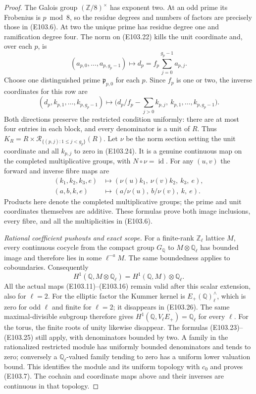 \begin{proof}
The Galois group $(\mathbb Z/8)^\times$ has exponent two.
At an odd prime its Frobenius is $p\bmod8$, so the residue
degrees and numbers of factors are precisely those in
(E103.6).  At two the unique prime has residue degree one
and ramification degree four.  The norm on (E103.22) kills
the unit coordinate and, over each $p$, is
\[
 (a_{p,0},\ldots,a_{p,g_p-1})\longmapsto
 d_p=f_p\sum_{j=0}^{g_p-1}a_{p,j}.
 \tag{E103.23}
\]
Choose one distinguished prime $\mathfrak p_{p,0}$ for each $p$.
Since $f_p$ is one or two, the inverse coordinates for this row are
\[
 (d_p,k_{p,1},\ldots,k_{p,g_p-1})\longmapsto
 \bigl(d_p/f_p-\sum_{j>0}k_{p,j},\ k_{p,1},\ldots,k_{p,g_p-1}\bigr).
 \tag{E103.24}
\]
Both directions preserve the restricted condition uniformly:
there are at most four entries in each block, and every
denominator is a unit of $R$.  Thus
$K_R=R\times\mathcal R_{\{(p,j):1\le j<g_p\}}(R)$.
Let $\nu$ be the norm section setting the unit coordinate and
all $k_{p,j}$ to zero in (E103.24).  It is a genuine continuous
map on the completed multiplicative groups, with $N\circ\nu=\operatorname{id}$.
For any $(u,v)$ the forward and inverse fibre maps are
\[
 \begin{split}
 (k_1,k_2,k_3,e)&\longmapsto
       (\nu(u)k_1,\ \nu(v)k_2,\ k_3,\ e),\\
 (a,b,k,e)&\longmapsto
       (a/\nu(u),\ b/\nu(v),\ k,\ e).
 \end{split}
 \tag{E103.25}
\]
Products here denote the completed multiplicative groups;
the prime and unit coordinates themselves are additive.
These formulas prove both image inclusions, every fibre,
and all the multiplicities in (E103.6).

\emph{Rational coefficient pushouts and exact scope.}
For a finite-rank $\mathbb Z_\ell$ lattice $M$, every continuous
cocycle from the compact group $G_{\mathbb Q}$ to
$M\otimes\mathbb Q_\ell$ has bounded image and therefore lies
in some $\ell^{-a}M$.  The same boundedness applies to
coboundaries.  Consequently
\[
 H^1(\mathbb Q,M\otimes\mathbb Q_\ell)
       =H^1(\mathbb Q,M)\otimes\mathbb Q_\ell.
 \tag{E103.26}
\]
All the actual maps (E103.11)--(E103.16) remain valid after
this scalar extension, also for $\ell=2$.
For the elliptic factor the Kummer kernel is
$E_+(\mathbb Q)^{\wedge}_\ell$, which is zero for odd $\ell$
and finite for $\ell=2$; it disappears in (E103.26).
The same maximal-divisible subgroup therefore gives
$H^1(\mathbb Q,V_\ell E_+)=\mathbb Q_\ell$ for every $\ell$.
For the torus, the finite roots of unity likewise disappear.
The formulas (E103.23)--(E103.25) still apply, with denominators
bounded by two.  A family in the rationalized restricted
module has uniformly bounded denominators and tends to zero;
conversely a $\mathbb Q_\ell$-valued family tending to zero has
a uniform lower valuation bound.  This identifies the module
and its uniform topology with $c_0$ and proves (E103.7).
The cochain and coordinate maps above and their inverses are
continuous in that topology.


\end{proof}
